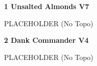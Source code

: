 \begin{multicols*}{2}
					\label{rt:Unsalted Almonds}\colorbox{Goldenrod!50}{\textbf{1 Unsalted Almonds V7  }}
					\begin{adjustwidth}{0.5cm}{}
					\begin{minipage}{\linewidth}					
					PLACEHOLDER
						\newline (No Topo) 
					\end{minipage}
					\end{adjustwidth}
					\label{rt:Dank Commander}\colorbox{RoyalBlue!20}{\textbf{2 Dank Commander V4  }}
					\begin{adjustwidth}{0.5cm}{}
					\begin{minipage}{\linewidth}					
					PLACEHOLDER
						\newline (No Topo) 
					\end{minipage}
					\end{adjustwidth}
\end{multicols*}
\clearpage